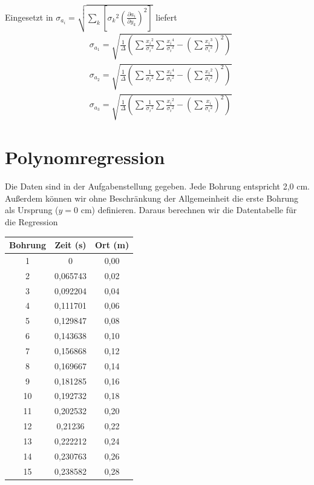 \documentclass[prb,12pt]{revtex4-2}
\theoremstyle{definition}
\theoremstyle{definition}
\begin{document}
	Eingesetzt in ${\sigma_{a_i}}=\sqrt{\sum\limits_k\left[{\sigma_k}^2\left(\frac{\partial a_i}{\partial y_k}\right)^2\right]}$ liefert
	\begin{align*}
		&\sigma_{a_1}=\sqrt{\frac{1}{\Delta}\left(\sum \frac{{x_i}^2}{{\sigma_i}^2}\sum \frac{{x_i}^4}{{\sigma_i}^2}-\left(\sum \frac{{x_i}^3}{{\sigma_i}^2}\right)^2\right)}\\
		&\sigma_{a_2}=\sqrt{\frac{1}{\Delta}\left(\sum \frac{1}{{\sigma_i}^2}\sum \frac{{x_i}^4}{{\sigma_i}^2}-\left(\sum \frac{{x_i}^2}{{\sigma_i}^2}\right)^2\right)}\\
		&\sigma_{a_3}=\sqrt{\frac{1}{\Delta}\left(\sum \frac{1}{{\sigma_i}^2}\sum \frac{{x_i}^2}{{\sigma_i}^2}-\left(\sum \frac{{x_i}}{{\sigma_i}^2}\right)^2\right)}
	\end{align*}
\section{Polynomregression}
Die Daten sind in der Aufgabenstellung gegeben. Jede Bohrung entspricht 2,0 cm. Außerdem können wir ohne Beschränkung der Allgemeinheit die erste Bohrung als Ursprung ($y=0\text{ cm}$) definieren. Daraus berechnen wir die Datentabelle für die Regression

\begin{center}
	\begin{tabular}{ccc}
		\toprule
		\textbf{Bohrung} & \textbf{Zeit (s)} & \textbf{Ort (m)}\\\midrule
		1 & 0 & 0,00 \\\midrule
		2 & 0,065743 & 0,02 \\\midrule
		3 & 0,092204 & 0,04 \\\midrule
		4 & 0,111701 & 0,06 \\\midrule
		5 & 0,129847 & 0,08 \\\midrule
		6 & 0,143638 & 0,10 \\\midrule
		7 & 0,156868 & 0,12 \\\midrule
		8 & 0,169667 & 0,14 \\\midrule
		9 & 0,181285 & 0,16 \\\midrule
		10 & 0,192732 & 0,18 \\\midrule
		11 & 0,202532 & 0,20 \\\midrule
		12 & 0,21236 & 0,22 \\\midrule
		13 & 0,222212 & 0,24 \\\midrule
		14 & 0,230763 & 0,26 \\\midrule
		15 & 0,238582 & 0,28 \\\bottomrule
	\end{tabular}
\end{center}
\end{document}
